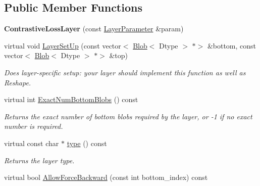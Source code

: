 \subsection*{Public Member Functions}
\begin{DoxyCompactItemize}
\item 
\mbox{\label{classcaffe_1_1_contrastive_loss_layer_aab41120fe462451196d14321264aef60}} 
{\bfseries Contrastive\+Loss\+Layer} (const \mbox{\hyperlink{classcaffe_1_1_layer_parameter}{Layer\+Parameter}} \&param)
\item 
virtual void \mbox{\hyperlink{classcaffe_1_1_contrastive_loss_layer_a943e67e7bb9c2362ec20ce44c777beac}{Layer\+Set\+Up}} (const vector$<$ \mbox{\hyperlink{classcaffe_1_1_blob}{Blob}}$<$ Dtype $>$ $\ast$$>$ \&bottom, const vector$<$ \mbox{\hyperlink{classcaffe_1_1_blob}{Blob}}$<$ Dtype $>$ $\ast$$>$ \&top)
\begin{DoxyCompactList}\small\item\em Does layer-\/specific setup\+: your layer should implement this function as well as Reshape. \end{DoxyCompactList}\item 
virtual int \mbox{\hyperlink{classcaffe_1_1_contrastive_loss_layer_aa6f3ad6918e64ffa1828e821accf25e9}{Exact\+Num\+Bottom\+Blobs}} () const
\begin{DoxyCompactList}\small\item\em Returns the exact number of bottom blobs required by the layer, or -\/1 if no exact number is required. \end{DoxyCompactList}\item 
\mbox{\label{classcaffe_1_1_contrastive_loss_layer_ab88839b44729c1bd11de97a44011aaa9}} 
virtual const char $\ast$ \mbox{\hyperlink{classcaffe_1_1_contrastive_loss_layer_ab88839b44729c1bd11de97a44011aaa9}{type}} () const
\begin{DoxyCompactList}\small\item\em Returns the layer type. \end{DoxyCompactList}\item 
virtual bool \mbox{\hyperlink{classcaffe_1_1_contrastive_loss_layer_af0f16d5119ac6118b670c1966c38fd7d}{Allow\+Force\+Backward}} (const int bottom\+\_\+index) const
\item 
\mbox{\label{classcaffe_1_1_contrastive_loss_layer_aab41120fe462451196d14321264aef60}} 

\end{DoxyCompactItemize}
